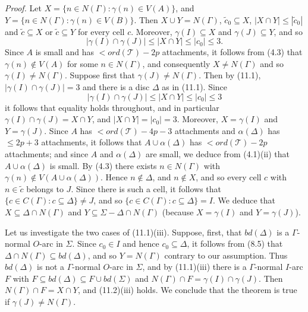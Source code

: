 \textit{Proof.} Let $X = \{n \in N(\Gamma) : \gamma(n) \in V(A)\}$, and $Y = \{n \in N(\Gamma) : \gamma(n) \in V(B)\}$. Then $X \cup Y = N(\Gamma)$, $\tilde{c}_0 \subseteq X$, $|X \cap Y| \le |\tilde{c}_0|$ and $\tilde{c} \subseteq X$ or $\tilde{c} \subseteq Y$ for every cell $c$. Moreover, $\gamma(I) \subseteq X$ and $\gamma(J) \subseteq Y$, and so
\begin{equation*}
|\gamma(I) \cap \gamma(J)| \le |X \cap Y| \le |c_0| \le 3.
\end{equation*}
Since $A$ is small and has $<ord(\mathscr{T}) - 2p$ attachments, it follows from (4.3) that $\gamma(n) \notin V(A)$ for some $n \in N(\Gamma)$, and consequently $X \ne N(\Gamma)$ and so $\gamma(I) \ne N(\Gamma)$. Suppose first that $\gamma(J) \ne N(\Gamma)$. Then by (11.1), $|\gamma(I) \cap \gamma(J)| = 3$ and there is a disc $\Delta$ as in (11.1). Since
\begin{equation*}
|\gamma(I) \cap \gamma(J)| \le |X \cap Y| \le |c_0| \le 3
\end{equation*}
it follows that equality holds throughout, and in particular $\gamma(I) \cap \gamma(J) = X \cap Y$, and $|X \cap Y| = |c_0| = 3$. Moreover, $X = \gamma(I)$ and $Y = \gamma(J)$. Since $A$ has $<ord(\mathscr{T}) - 4p - 3$ attachments and $\alpha(\Delta)$ has $\le 2p + 3$ attachments, it follows that $A \cup \alpha(\Delta)$ has $<ord(\mathscr{T}) - 2p$ attachments; and since $A$ and $\alpha(\Delta)$ are small, we deduce from (4.1)(ii) that $A \cup \alpha(\Delta)$ is small. By (4.3) there exists $n \in N(\Gamma)$ with $\gamma(n) \notin V(A \cup \alpha(\Delta))$. Hence $n \notin \Delta$, and $n \notin X$, and so every cell $c$ with $n \in \tilde{c}$ belongs to $J$. Since there is such a cell, it follows that $\{c \in C(\Gamma) : c \subseteq \Delta\} \ne J$, and so $\{c \in C(\Gamma) : c \subseteq \Delta\} = I$. We deduce that $X \subseteq \Delta \cap N(\Gamma)$ and $Y \subseteq \Sigma - \Delta \cap N(\Gamma)$ (because $X = \gamma(I)$ and $Y = \gamma(J)$).

Let us investigate the two cases of (11.1)(iii). Suppose, first, that $bd(\Delta)$ is a $\Gamma$-normal $O$-arc in $\Sigma$. Since $c_0 \in I$ and hence $c_0 \subseteq \Delta$, it follows from (8.5) that $\Delta \cap N(\Gamma) \subseteq bd(\Delta)$, and so $Y = N(\Gamma)$ contrary to our assumption. Thus $bd(\Delta)$ is not a $\Gamma$-normal $O$-arc in $\Sigma$, and by (11.1)(iii) there is a $\Gamma$-normal $I$-arc $F$ with $F \subseteq bd(\Delta) \subseteq F \cup bd(\Sigma)$ and $N(\Gamma) \cap F = \gamma(I) \cap \gamma(J)$. Then $N(\Gamma) \cap F = X \cap Y$, and (11.2)(iii) holds. We conclude that the theorem is true if $\gamma(J) \ne N(\Gamma)$.

